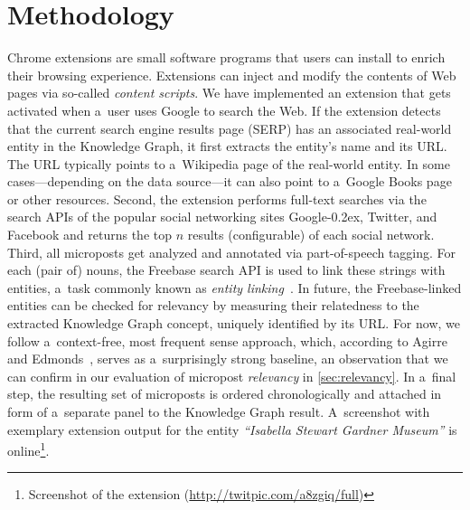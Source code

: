 \documentclass[runningheads,a4paper]{llncs}
\newcommand{\googleplus}{Google\nolinebreak\hspace{0em}\raisebox{.28ex}{\tiny\bf +}\kern-0.2ex\xspace}
\begin{document}
\section{Methodology}
Chrome extensions are small software programs that users can install
to enrich their browsing experience.
Extensions can inject and modify the contents of Web pages
via so-called \emph{content scripts}.
We have implemented an extension that gets activated
when a~user uses Google to search the Web.
If the extension detects that the current search engine results page (SERP)
has an associated real-world entity in the Knowledge Graph,
it first extracts the entity's name and its URL.
The URL typically points to a~Wikipedia page of the real-world entity.
In some cases---depending on the data source---it
can also point to a~Google Books page or other resources.
Second, the extension performs full-text searches via the search APIs of
the popular social networking sites \googleplus, Twitter, and Facebook
and returns the top $n$ results (configurable) of each social network.
Third, all microposts get analyzed and annotated via part-of-speech tagging.
For each (pair of) nouns, the Freebase search API is used
to link these strings with entities,
a~task commonly known as \emph{entity linking}~\cite{spitkovsky2012}.
In future, the Freebase-linked entities can be checked for relevancy
by measuring their relatedness to the extracted Knowledge Graph concept,
uniquely identified by its URL.
For now, we follow a~context-free, most frequent sense approach,
which, according to Agirre and Edmonds~\cite{agirre2007},
serves as a~surprisingly strong baseline,
an observation that we can confirm in our evaluation of micropost \emph{relevancy}
in \autoref{sec:relevancy}.
In a~final step, the resulting set of microposts is ordered chronologically
and attached in form of a~separate panel to the Knowledge Graph result.
A~screenshot with exemplary extension output for the entity
\emph{``Isabella Stewart Gardner Museum''}
is online\footnote{Screenshot of the extension (\url{http://twitpic.com/a8zgiq/full})}.

\end{document}
